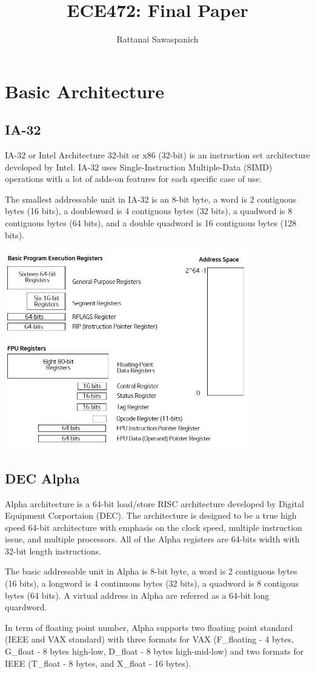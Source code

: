 \documentclass[letterpaper,10pt,titlepage]{article}
\title{ECE472: Final Paper}
\author{Rattanai Sawaspanich}
\begin{document}
\maketitle

\section{Basic Architecture}
\subsection{IA-32}
IA-32 or Intel Architecture 32-bit or x86 (32-bit) is an instruction set
architecture developed by Intel. IA-32 uses Single-Instruction Multiple-Data
(SIMD) operations with a lot of adds-on features for each specific case of 
use. 
\par
The smallest addressable unit in IA-32 is an 8-bit byte, a word is 2 contiguous
bytes (16 bits), a doubleword is 4 contiguous bytes (32 bits), a quadword is
8 contiguous bytes (64 bits), and a double quadword is 16 contiguous bytes (128 bits).
\begin{center}
\includegraphics[width=0.8\textwidth]{x86_ovl.JPG}
\end{center}

\subsection{DEC Alpha}
Alpha architecture is a 64-bit load/store RISC architecture developed by
Digital Equipment Corportaion (DEC). The architecture is designed to be 
a true high speed 64-bit architecture with emphasis on the clock speed, 
multiple instruction issue, and multiple processors. All of the Alpha 
registers are 64-bits width with 32-bit length instructions. 
\par
The
basic addressable unit in Alpha is 8-bit byte, a word is 2 contiguous bytes 
(16 bits), a longword is 4 continuous bytes (32 bits), a quadword
is 8 contigous bytes (64 bits). A virtual address in Alpha are referred
as a 64-bit long quardword. 
\par
In term of floating point number, Alpha supports two floating point standard
(IEEE and VAX standard) with three formats for VAX (F\_floating - 4 bytes, 
G\_float - 8 bytes high-low, D\_float - 8 bytes high-mid-low) and two formats
for IEEE (T\_float - 8 bytes, and X\_float - 16 bytes).
\end{document}
